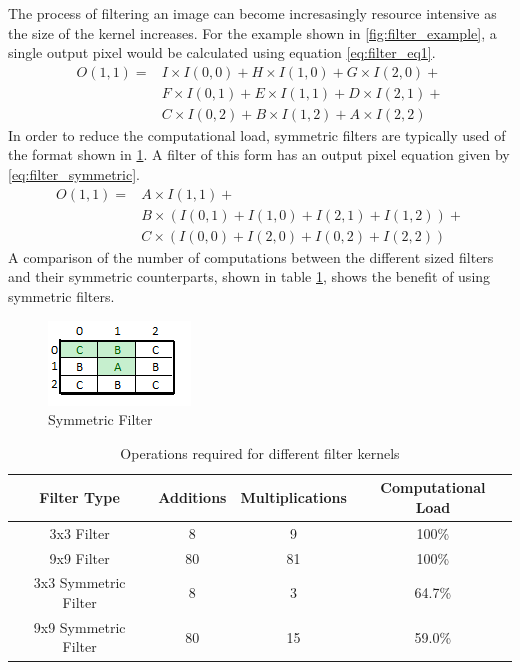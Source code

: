 The process of filtering an image can become incresasingly resource intensive as the size of the kernel increases.  For the example shown in \ref{fig:filter_example}, a single output pixel would be calculated using equation \eqref{eq:filter_eq1}.
\begin{equation}
  \begin{split}
  O(1,1) =& I\times I(0,0)+H\times I(1,0)+G\times I(2,0)+ \\
          &F\times I(0,1)+E\times I(1,1)+D\times I(2,1)+ \\
          &C\times I(0,2)+B\times I(1,2)+A\times I(2,2)
  \label{eq:filter_eq1}
  \end{split}
\end{equation}
In order to reduce the computational load, symmetric filters are typically used of the format shown in \ref{fig:filter_symmetric}. A filter of this form has an output pixel equation given by \eqref{eq:filter_symmetric}.
\begin{equation}
  \begin{split}
    O(1,1) =& A\times I(1,1)+ \\
            &B\times \left(I(0,1)+I(1,0)+I(2,1)+I(1,2)\right) +  \\
            &C\times \left(I(0,0)+I(2,0)+I(0,2)+I(2,2)\right)
  \label{eq:filter_symmetric}
  \end{split}
\end{equation}
A comparison of the number of computations between the different sized filters and their symmetric counterparts, shown in table \ref{tbl:filter_ops}, shows the benefit of using symmetric filters.
\begin{figure}[h]
  \centering
  \includegraphics{./img/filter_3x3_template.PNG}
  \caption{Symmetric Filter}
  \label{fig:filter_symmetric}
\end{figure} 

\begin{table}[h]
  \begin{tabular}{|c||c|c|c|}
    \hline 
    Filter Type & Additions & Multiplications & Computational Load \\ \hline \hline
    3x3 Filter &  8 & 9 & 100\%\\ \hline
    9x9 Filter & 80 & 81 & 100\% \\ \hline
    3x3 Symmetric Filter & 8 & 3 & 64.7\% \\ \hline
    9x9 Symmetric Filter & 80 & 15 & 59.0\% \\ \hline
  \end{tabular}
  \caption{Operations required for different filter kernels}
  \label{tbl:filter_ops}
\end{table}

